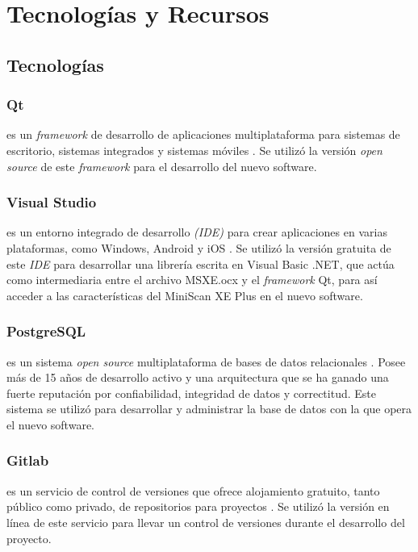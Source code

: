 \documentclass[conference]{IEEEtran}
\begin{document}
\vfill
\newpage

\section{Tecnolog\'{i}as y Recursos}	
	
	\subsection{Tecnolog\'{i}as}
		\subsubsection{Qt}
			es un \textit{framework} de desarrollo de aplicaciones multiplataforma para sistemas de escritorio, sistemas integrados y sistemas m\'{o}viles \cite{Qt}. Se utiliz\'{o} la versi\'{o}n \textit{open source} de este \textit{framework} para el desarrollo del nuevo software.
			
		\subsubsection{Visual Studio}
			es un entorno integrado de desarrollo \textit{(IDE)} para crear aplicaciones en varias plataformas, como Windows, Android y iOS \cite{VS}. Se utiliz\'{o} la versi\'{o}n gratuita de este \textit{IDE} para desarrollar una librer\'{i}a escrita en Visual Basic .NET, que act\'{u}a como intermediaria entre el archivo MSXE.ocx y el \textit{framework} Qt, para as\'{i} acceder a las caracter\'{i}sticas del MiniScan XE Plus en el nuevo software.
			
		\subsubsection{PostgreSQL}
			es un sistema \textit{open source} multiplataforma de bases de datos relacionales \cite{PostgreSQL}. Posee m\'{a}s de 15 a\~{n}os de desarrollo activo y una arquitectura que se ha ganado una fuerte reputaci\'{o}n por confiabilidad, integridad de datos y correctitud. Este sistema se utiliz\'{o} para desarrollar y administrar la base de datos con la que opera el nuevo software.
			
		\subsubsection{Gitlab}
			es un servicio de control de versiones que ofrece alojamiento gratuito, tanto p\'{u}blico como privado, de repositorios para proyectos \cite{Gitlab}. Se utiliz\'{o} la versi\'{o}n en l\'{i}nea de este servicio para llevar un control de versiones durante el desarrollo del proyecto.
\end{document}
